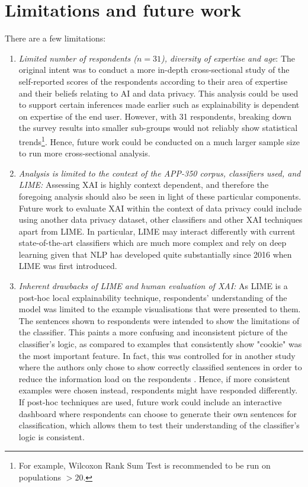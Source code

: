 \section{Limitations and future work}
There are a few limitations:
\begin{enumerate}
    \item \textit{Limited number of respondents ($n = 31$), diversity of expertise and age}: The original intent was to conduct a more in-depth cross-sectional study of the self-reported scores of the respondents according to their area of expertise and their beliefs relating to AI and data privacy. This analysis could be used to support certain inferences made earlier such as explainability is dependent on expertise of the end user. However, with 31 respondents, breaking down the survey results into smaller sub-groups would not reliably show statistical trends\footnote{For example, Wilcoxon Rank Sum Test is recommended to be run on populations $> 20$.}. Hence, future work could be conducted on a much larger sample size to run more cross-sectional analysis.
    
    \item \textit{Analysis is limited to the context of the APP-350 corpus, classifiers used, and LIME:} Assessing XAI is highly context dependent, and therefore the foregoing analysis should also be seen in light of these particular components. Future work to evaluate XAI within the context of data privacy could include using another data privacy dataset, other classifiers and other XAI techniques apart from LIME. In particular, LIME may interact differently with current state-of-the-art classifiers which are much more complex and rely on deep learning given that NLP has developed quite substantially since 2016 when LIME was first introduced.
    
    \item \textit{Inherent drawbacks of LIME and human evaluation of XAI:} As LIME is a post-hoc local explainability technique, respondents' understanding of the model was limited to the example visualisations that were presented to them. The sentences shown to respondents were intended to show the limitations of the classifier. This paints a more confusing and inconsistent picture of the classifier's logic, as compared to examples that consistently show "cookie" was the most important feature. In fact, this was controlled for in another study where the authors only chose to show correctly classified sentences in order to reduce the information load on the respondents \cite{gorski2021}. Hence, if more consistent examples were chosen instead, respondents might have responded differently. If post-hoc techniques are used, future work could include an interactive dashboard where respondents can choose to generate their own sentences for classification, which allows them to test their understanding of the classifier's logic is consistent.
    

\end{enumerate}
